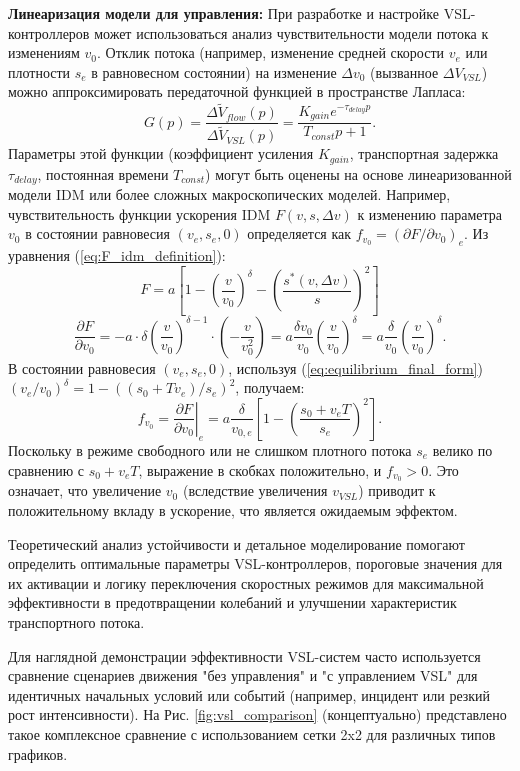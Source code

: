 \documentclass[12pt, a4paper]{article}
\begin{document}
\textbf{Линеаризация модели для управления:}
При разработке и настройке VSL-контроллеров может использоваться анализ чувствительности модели потока к изменениям $v_0$. Отклик потока (например, изменение средней скорости $v_e$ или плотности $s_e$ в равновесном состоянии) на изменение $\Delta v_0$ (вызванное $\Delta V_{VSL}$) можно аппроксимировать передаточной функцией в пространстве Лапласа:
\[ G(p) = \frac{\Delta \tilde{V}_{flow}(p)}{\Delta \tilde{V}_{VSL}(p)} = \frac{K_{gain} e^{-\tau_{delay} p}}{T_{const} p + 1}. \]
Параметры этой функции (коэффициент усиления $K_{gain}$, транспортная задержка $\tau_{delay}$, постоянная времени $T_{const}$) могут быть оценены на основе линеаризованной модели IDM или более сложных макроскопических моделей. Например, чувствительность функции ускорения IDM $F(v,s,\Delta v)$ к изменению параметра $v_0$ в состоянии равновесия $(v_e, s_e, 0)$ определяется как $f_{v_0} = (\partial F / \partial v_0)_e$. Из уравнения (\ref{eq:F_idm_definition}):
\[ F = a \left[1 - \left(\frac{v}{v_0}\right)^\delta - \left( \frac{s^*(v, \Delta v)}{s} \right)^2 \right] \]
\[ \frac{\partial F}{\partial v_0} = -a \cdot \delta \left(\frac{v}{v_0}\right)^{\delta-1} \cdot \left(-\frac{v}{v_0^2}\right) = a \frac{\delta v_0}{v_0} \left(\frac{v}{v_0}\right)^\delta = a \frac{\delta}{v_0} \left(\frac{v}{v_0}\right)^\delta. \]
В состоянии равновесия $(v_e, s_e, 0)$, используя (\ref{eq:equilibrium_final_form}) $\left(v_e/v_0\right)^\delta = 1 - \left( (s_0 + T v_e) / s_e \right)^2$, получаем:
\[ f_{v_0} = \left.\frac{\partial F}{\partial v_0}\right|_e = a \frac{\delta}{v_{0,e}} \left[ 1 - \left( \frac{s_0+v_eT}{s_e} \right)^2 \right]. \]
Поскольку в режиме свободного или не слишком плотного потока $s_e$ велико по сравнению с $s_0+v_eT$, выражение в скобках положительно, и $f_{v_0} > 0$. Это означает, что увеличение $v_0$ (вследствие увеличения $v_{VSL}$) приводит к положительному вкладу в ускорение, что является ожидаемым эффектом.

Теоретический анализ устойчивости и детальное моделирование помогают определить оптимальные параметры VSL-контроллеров, пороговые значения для их активации и логику переключения скоростных режимов для максимальной эффективности в предотвращении колебаний и улучшении характеристик транспортного потока.

Для наглядной демонстрации эффективности VSL-систем часто используется сравнение сценариев движения "без управления" и "с управлением VSL" для идентичных начальных условий или событий (например, инцидент или резкий рост интенсивности). На Рис. \ref{fig:vsl_comparison} (концептуально) представлено такое комплексное сравнение с использованием сетки 2x2 для различных типов графиков.
\end{document}

